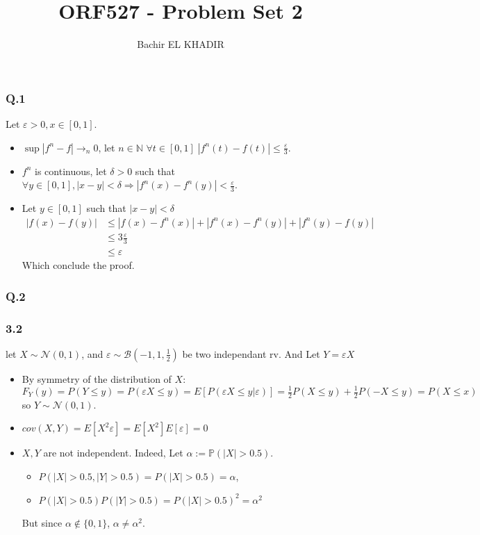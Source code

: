 \documentclass[12pt]{article}
\title{ORF527 - Problem Set 2}
\author{Bachir EL KHADIR }
\newcommand{\Q}[1]{\subsubsection*{Q.#1}}
\begin{document}
\maketitle
\Q{1}

Let $\varepsilon > 0, x \in [0, 1]$.

\begin{itemize}
\item $\sup |f^n - f| \rightarrow_n 0$, let $n \in \mathbb N$
  $\forall t \in [0, 1] \; |f^n(t) - f(t)| \le \frac{\varepsilon}3$.

\item $f^n$ is continuous, let $\delta > 0$ such that
  $\forall y \in [0, 1], |x-y| < \delta \Rightarrow |f^n(x) - f^n(y)|
  < \frac{\varepsilon}3$.  
\item
  Let $y \in [0, 1]$ such that $|x - y| < \delta$
  \begin{align*}
    |f(x) - f(y)|
    & \le |f(x) - f^n(x)| + |f^n(x) - f^n(y)| + |f^n(y) - f(y)|
    \\&\le 3 \frac{\varepsilon}3
    \\&\le \varepsilon 
  \end{align*}
  Which conclude the proof.
\end{itemize}

\Q{2}
\subsubsection*{3.2}

let $X \sim \mathcal N(0,1)$, and $\varepsilon \sim \mathcal B(-1, 1, \frac1 2)$ be two independant rv. And Let $Y = \varepsilon X$
\begin{itemize}
\item By symmetry of the distribution of $X$:
$F_Y(y) = P(Y \leq y) = P(\varepsilon X \leq y) = E[ P(\varepsilon X \leq y | \varepsilon) ] = \frac1 2 P(X \leq y) + \frac1 2 P(- X \leq y) = P(X \leq x)$
so $Y \sim \mathcal N(0, 1)$.

\item $cov(X, Y) = E[X^2 \varepsilon] = E[X^2]E[\varepsilon] = 0$
\item  $X, Y$ are not independent. Indeed, Let $\alpha := \mathbb P(|X| > 0.5)$.
  \begin{itemize}
  \item $P(|X| > 0.5, |Y| > 0.5) = P(|X| > 0.5) = \alpha$,
  \item $P(|X| > 0.5) P(|Y| > 0.5) = P(|X| > 0.5)^2 = \alpha^2$
  \end{itemize}
  But since $\alpha \not \in \{0, 1\}$, $\alpha \ne \alpha^2$.
\end{itemize}
\end{document}
